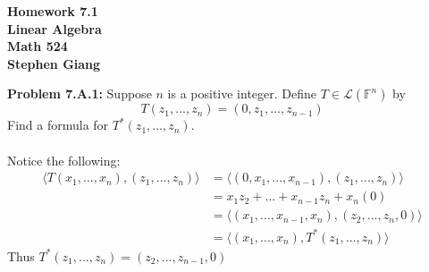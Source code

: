 \documentclass[12pt]{article}
\begin{document}
	
	\begin{center}
		\textbf{Homework 7.1} \\
		\textbf{Linear Algebra} \\
		\textbf{Math 524} \\
		\textbf{Stephen Giang} \\
	\end{center}

\noindent \textbf{Problem 7.A.1: }Suppose $n$ is a positive integer. Define $T \in \mathcal{L}(\mathbb{F}^n)$ by
	$$
	T(z_1,...,z_n) = (0,z_1,...,z_{n-1})
	$$
Find a formula for $T^*(z_1,...,z_n)$.
\\ \\
Notice the following:	
	\begin{align*}
		\langle T(x_1,...,x_n) , (z_1,...,z_n)\rangle &= \langle (0,x_1,...,x_{n-1}),(z_1,...,z_n)\rangle \\
		&= x_1z_2 + ... + x_{n-1}z_n + x_n(0) \\
		&= \langle (x_1,...,x_{n-1},x_n), (z_2, ..., z_{n}, 0) \rangle \\
		&= \langle (x_1,...,x_n), T^*(z_1,...,z_n) \rangle
	\end{align*}
Thus $T^*(z_1,...,z_n) = (z_2, ..., z_{n-1}, 0)$

\newpage 
\end{document}
